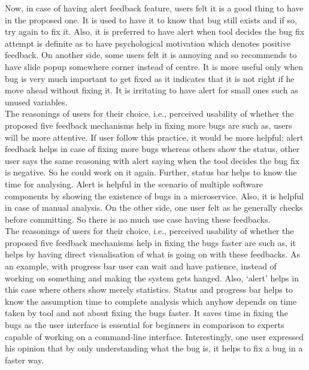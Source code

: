 Now, in case of having alert feedback feature, users felt it is a good thing to have in the proposed one. It is used to have it to know that bug still exists and if so, try again to fix it. Also, it is preferred to have alert when tool decides the bug fix attempt is definite as to have psychological motivation which denotes positive feedback. On another side, some users felt it is annoying and so recommends to have slide popup somewhere corner instead of centre. It is more useful only when bug is very much important to get fixed as it indicates that it is not right if he move ahead without fixing it. It is irritating to have alert for small ones such as unused variables. \\
 
The reasonings of users for their choice, i.e., perceived usability of whether the proposed five feedback mechanisms help in fixing more bugs are such as, users will be more attentive. If user follow this practice, it would be more helpful; alert feedback helps in case of fixing more bugs whereas others show the status, other user says the same reasoning with alert saying when the tool decides the bug fix is negative. So he could work on it again. Further, status bar helps to know the time for analysing. Alert is helpful in the scenario of multiple software components by showing the existence of bugs in a microservice. Also, it is helpful in case of manual analysis. On the other side, one user felt as he generally checks before committing. So there is no much use case having these feedbacks.  \\

The reasonings of users for their choice, i.e., perceived usability of whether the proposed five feedback mechanisms help in fixing the bugs faster are such as, it helps by having direct visualisation of what is going on with these feedbacks. As an example, with progress bar user can wait and have patience, instead of working on something and making the system gets hanged. Also, ‘alert’ helps in this case where others show merely statistics. Status and progress bar helps to know the assumption time to complete analysis which anyhow depends on time taken by tool and not about fixing the bugs faster. It saves time in fixing the bugs as the user interface is essential for beginners in comparison to experts capable of working on a command-line interface. Interestingly, one user expressed his opinion that by only understanding what the bug is, it helps to fix a bug in a faster way. \\


